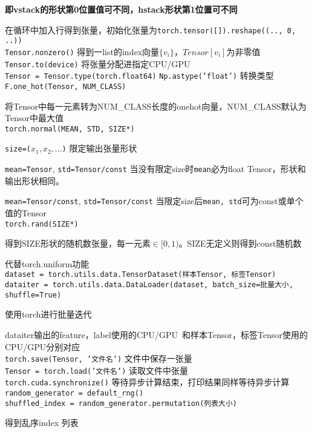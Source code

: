 \documentclass[UTF8]{ctexart}
\begin{document}
  \textbf{即vstack的形状第0位置值可不同，hstack形状第1位置可不同}

  在循环中加入行得到张量，初始化张量为\texttt{torch.tensor([]).reshape((.., 0, ..))}\\
\texttt{Tensor.nonzero()} 得到一list的index向量$\{v_i\}$，$Tensor[v_i]$为非零值\\
\texttt{Tensor.to(device)} 将张量分配进指定CPU/GPU\\
\texttt{Tensor = Tensor.type(torch.float64)} \texttt{Np.astype('float')} 转换类型\\
\texttt{F.one\_hot(Tensor, NUM\_CLASS)} 

  将Tensor中每一元素转为NUM\_CLASS长度的onehot向量，NUM\_CLASS默认为Tensor中最大值\\
\texttt{torch.normal(MEAN, STD, SIZE*)}

  \texttt{size=($x_1, x_2, ...$)} 限定输出张量形状

  \texttt{mean=Tensor}, \texttt{std=Tensor/const} 当没有限定size时\texttt{mean}必为float Tensor，形状和输出形状相同。

  \texttt{mean=Tensor/const}, \texttt{std=Tensor/const} 当限定size后\texttt{mean, std}可为const或单个值的Tensor\\
\texttt{torch.rand(SIZE*)}

  得到SIZE形状的随机数张量，每一元素$\in [0,1)$。SIZE无定义则得到const随机数

  代替torch.uniform功能\\
\texttt{dataset = torch.utils.data.TensorDataset(样本Tensor, 标签Tensor)}\\
\texttt{dataiter = torch.utils.data.DataLoader(dataset, batch\_size=批量大小, shuffle=True)}

  使用torch进行批量迭代
  
  dataiter输出的feature，label使用的CPU/GPU\ 和样本Tensor，标签Tensor使用的CPU/GPU分别对应\\
\texttt{torch.save(Tensor, '文件名')} 文件中保存一张量\\
\texttt{Tensor = torch.load('文件名')} 读取文件中张量\\
\texttt{torch.cuda.synchronize()} 等待异步计算结束，打印结果同样等待异步计算\\
\texttt{random\_generator = default\_rng()}\\
\texttt{shuffled\_index = random\_generator.permutation(列表大小)}

  得到乱序index 列表

\end{document}
